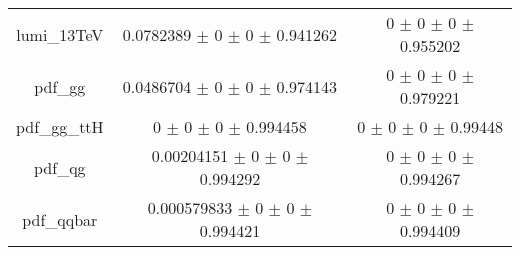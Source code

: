 \begin{table}
\begin{tabular}{ccc}
lumi\_13TeV & \num{0.0782389} $\pm$ \num{0} $\pm$ \num{0} $\pm$ \num{0.941262} & \num{0} $\pm$ \num{0} $\pm$ \num{0} $\pm$ \num{0.955202}\\
pdf\_gg & \num{0.0486704} $\pm$ \num{0} $\pm$ \num{0} $\pm$ \num{0.974143} & \num{0} $\pm$ \num{0} $\pm$ \num{0} $\pm$ \num{0.979221}\\
pdf\_gg\_ttH & \num{0} $\pm$ \num{0} $\pm$ \num{0} $\pm$ \num{0.994458} & \num{0} $\pm$ \num{0} $\pm$ \num{0} $\pm$ \num{0.99448}\\
pdf\_qg & \num{0.00204151} $\pm$ \num{0} $\pm$ \num{0} $\pm$ \num{0.994292} & \num{0} $\pm$ \num{0} $\pm$ \num{0} $\pm$ \num{0.994267}\\
pdf\_qqbar & \num{0.000579833} $\pm$ \num{0} $\pm$ \num{0} $\pm$ \num{0.994421} & \num{0} $\pm$ \num{0} $\pm$ \num{0} $\pm$ \num{0.994409}\\
\bottomrule
\end{tabular}
\end{table}